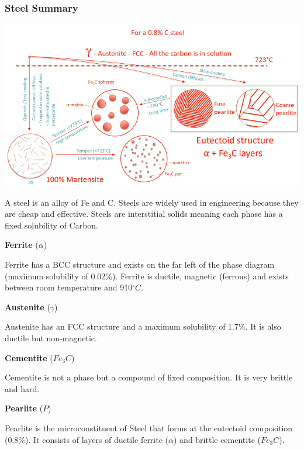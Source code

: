 \documentclass[12pt]{article}
\begin{document}
\subsubsection{Steel Summary}
\includegraphics[scale=0.4]{steelsummary}

A steel is an alloy of Fe and C.
Steels are widely used in engineering because they are cheap and effective. 
Steels are interstitial solids meaning each phase has a fixed solubility of Carbon.

\begin{theorem*}
  \textbf{Ferrite} ($\alpha$)

  Ferrite has a BCC structure and exists on the far left of the phase diagram (maximum solubility of 0.02\%).
  Ferrite is ductile, magnetic (ferrous) and exists between room temperature and 910$^\circ C$.
\end{theorem*}

\begin{theorem*}
  \textbf{Austenite} ($\gamma$)

  Austenite has an FCC structure and a maximum solubility of 1.7\%.
  It is also ductile but non-magnetic.
\end{theorem*}

\begin{theorem*}
  \textbf{Cementite} ($Fe_3C$)

  Cementite is not a phase but a compound of fixed composition.
  It is very brittle and hard.
\end{theorem*}

\begin{theorem*}
  \textbf{Pearlite} ($P$)

  Pearlite is the microconstituent of Steel that forms at the eutectoid composition (0.8\%).
  It consists of layers of ductile ferrite ($\alpha$) and brittle cementite ($Fe_3C$).
\end{theorem*}
\end{document}
